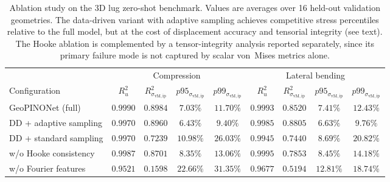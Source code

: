 \begin{table}[htb]
\centering
\caption{Ablation study on the 3D lug zero-shot benchmark. Values are
averages over 16 held-out validation geometries. The data-driven
variant with adaptive sampling achieves competitive stress percentiles
relative to the full model, but at the cost of displacement accuracy
and tensorial integrity (see text). The Hooke ablation is complemented
by a tensor-integrity analysis reported separately, since its primary
failure mode is not captured by scalar von~Mises metrics alone.}
\label{tab:ablation_compact}
\setlength{\tabcolsep}{4pt}
\small
\begin{tabular}{lcccc|cccc}
\toprule
& \multicolumn{4}{c|}{Compression} & \multicolumn{4}{c}{Lateral bending} \\
\cmidrule(lr){2-5}\cmidrule(lr){6-9}
Configuration
& $R^2_u$
& $R^2_{\sigma_{\mathrm{vM,ip}}}$
& $p95_{\sigma_{\mathrm{vM,ip}}}$
& $p99_{\sigma_{\mathrm{vM,ip}}}$
& $R^2_u$
& $R^2_{\sigma_{\mathrm{vM,ip}}}$
& $p95_{\sigma_{\mathrm{vM,ip}}}$
& $p99_{\sigma_{\mathrm{vM,ip}}}$ \\
\midrule
GeoPINONet (full)
& $0.9990$ & $0.8984$ & $7.03\%$ & $11.70\%$
& $0.9993$ & $0.8520$ & $7.41\%$ & $12.43\%$ \\
DD + adaptive sampling
& $0.9970$ & $0.8960$ & $6.43\%$ & $9.40\%$
& $0.9985$ & $0.8805$ & $6.63\%$ & $9.76\%$ \\
DD + standard sampling
& $0.9970$ & $0.7239$ & $10.98\%$ & $26.03\%$
& $0.9945$ & $0.7440$ & $8.69\%$ & $20.82\%$ \\
w/o Hooke consistency
& $0.9987$ & $0.8701$ & $8.35\%$ & $13.06\%$
& $0.9995$ & $0.7853$ & $8.45\%$ & $14.18\%$ \\
w/o Fourier features
& $0.9521$ & $0.1598$ & $22.66\%$ & $31.35\%$
& $0.9677$ & $0.5194$ & $12.81\%$ & $18.74\%$ \\
\bottomrule
\end{tabular}
\end{table}
